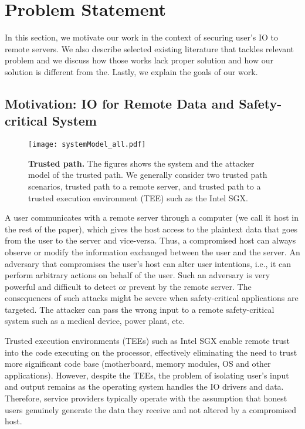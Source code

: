 \section{Problem Statement}
\label{sec:problemStatement}



In this section, we motivate our work in the context of securing user's IO to remote servers. We also describe selected existing literature that tackles relevant problem and we discuss how those works lack proper solution and how our solution is different from the. Lastly, we explain the goals of our work.

\subsection{Motivation: IO for Remote Data and Safety-critical System}

\begin{figure}[t]
\centering
\texttt{[image: systemModel\_all.pdf]}
\caption{\textbf{Trusted path.} The figures shows the system and the attacker model of the trusted path. We generally consider two trusted path scenarios, \one trusted path to a remote server, and \two trusted path to a trusted execution environment (TEE) such as the Intel SGX.}
\label{fig:trustedPath}
\centering
\end{figure}

A user communicates with a remote server through a computer (we call it host in the rest of the paper), which gives the host access to the plaintext data that goes from the user to the server and vice-versa. Thus, a compromised host can always observe or modify the information exchanged between the user and the server. An adversary that compromises the user's host can alter user intentions, i.e., it can perform arbitrary actions on behalf of the user. Such an adversary is very powerful and difficult to detect or prevent by the remote server. The consequences of such attacks might be severe when safety-critical applications are targeted. The attacker can pass the wrong input to a remote safety-critical system such as a medical device, power plant, etc. 

Trusted execution environments (TEEs) such as Intel SGX enable remote trust into the code executing on the processor, effectively eliminating the need to trust more significant code base (motherboard, memory modules, OS and other applications). However, despite the TEEs, the problem of isolating user's input and output remains as the operating system handles the IO drivers and data. Therefore, service providers typically operate with the assumption that honest users genuinely generate the data they receive and not altered by a compromised host. %


